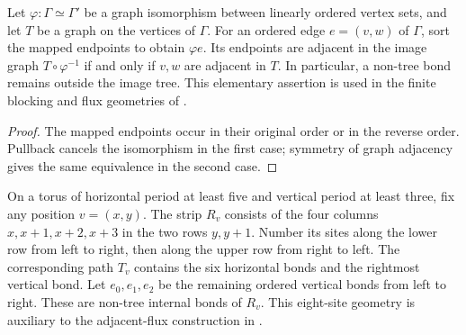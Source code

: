 \begin{lemma}%
    \label{thm:peps_edge_map_subgraph}
    \leanok
    Let $\varphi:\Gamma\simeq\Gamma'$ be a graph isomorphism between
    linearly ordered vertex sets, and let $T$ be a graph on the vertices
    of $\Gamma$. For an ordered edge $e=(v,w)$ of $\Gamma$, sort the
    mapped endpoints to obtain $\varphi e$. Its endpoints are adjacent
    in the image graph $T\circ\varphi^{-1}$ if and only if $v,w$
    are adjacent in $T$. In particular, a non-tree bond remains outside
    the image tree. This elementary assertion is used in the finite
    blocking and flux geometries of \cite{Schuch2010PEPS}.
\end{lemma}

\begin{proof}\leanok
    The mapped endpoints occur in their original order or in the reverse
    order. Pullback cancels the isomorphism in the first case; symmetry
    of graph adjacency gives the same equivalence in the second case.
\end{proof}

\begin{definition}%
    \label{def:peps_three_plaquette_geometry}
    \leanok
    On a torus of horizontal period at least five and vertical period at
    least three, fix any position $v=(x,y)$. The strip $R_v$ consists of the
    four columns $x,x+1,x+2,x+3$ in the two rows $y,y+1$.
    Number its sites along the lower row from left to right, then along the
    upper row from right to left. The corresponding path $T_v$ contains
    the six horizontal bonds and the rightmost vertical bond.
    Let $e_0,e_1,e_2$ be the remaining ordered vertical bonds from left to
    right. These are non-tree internal bonds of $R_v$.
    This eight-site geometry is auxiliary to the adjacent-flux construction
    in \cite[braiding passage]{Schuch2010PEPS}.
\end{definition}

